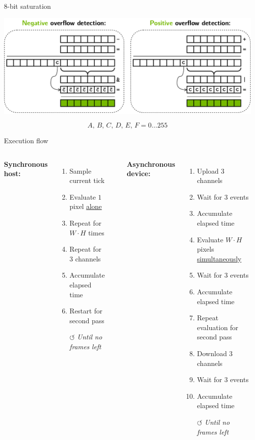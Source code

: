 \documentclass[aspectratio=1610]{beamer}
\begin{document}
\begin{frame}{\textcolor{NvidiaGreen}{8-bit saturation}}
    \begin{center}
        \includegraphics[width=\linewidth,keepaspectratio]{saturation.pdf}
    \end{center}

    \[A,\,B,\,C,\,D,\,E,\,F=0\dots 255\]
\end{frame}

\begin{frame}{\textcolor{NvidiaGreen}{Execution flow}}
    \begin{columns}[T]
        \centering
        \textbf{Synchronous host:}
        \begin{enumerate}
            \item Sample current tick
            \item Evaluate $1$ pixel \underline{alone}
            \item Repeat for $W\cdot H$ times
            \item Repeat for $3$ channels
            \item Accumulate elapsed time
            \item Restart for second pass
            \item[$\circlearrowleft$] \textit{Until no frames left}
        \end{enumerate}
        \centering
        \rule{0.2mm}{0.7075\textheight}
        \centering
        \textbf{Asynchronous \textcolor{NvidiaGreen}{device}:}
        \begin{enumerate}
            \item Upload $3$ channels
            \item Wait for $3$ events
            \item Accumulate elapsed time
            \item Evaluate $W\cdot H$ pixels \underline{simultaneously}
            \item Wait for $3$ events
            \item Accumulate elapsed time
            \item Repeat evaluation for second pass
            \item Download $3$ channels
            \item Wait for $3$ events
            \item Accumulate elapsed time
            \item[$\circlearrowleft$] \textit{Until no frames left}
        \end{enumerate}
    \end{columns}
\end{frame}
\end{document}
